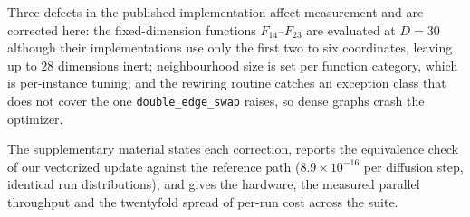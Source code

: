 Three defects in the published implementation affect measurement and are
corrected here: the fixed-dimension functions $F_{14}$--$F_{23}$ are
evaluated at $D=30$ although their implementations use only the first two to
six coordinates, leaving up to $28$ dimensions inert; neighbourhood size is
set per function category, which is per-instance tuning; and the rewiring
routine catches an exception class that does not cover the one
\texttt{double\_edge\_swap} raises, so dense graphs crash the optimizer.

The supplementary material states each correction, reports the equivalence
check of our vectorized update against the reference path
($8.9\times10^{-16}$ per diffusion step, identical run distributions), and
gives the hardware, the measured parallel throughput and the twentyfold
spread of per-run cost across the suite.
